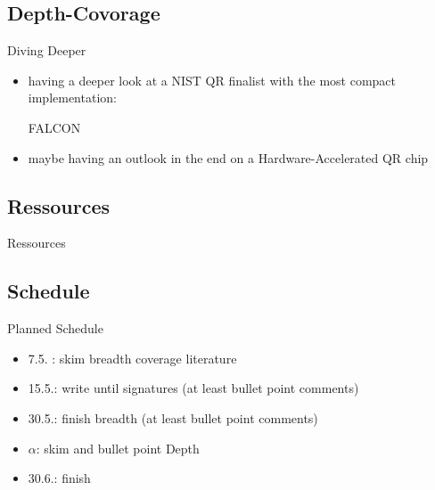 \documentclass[ucs,10pt]{beamer}
\begin{document}
\subsection{Depth-Covorage}
\begin{frame}{Diving Deeper}
  \begin{itemize}
    \item  having a deeper look at a NIST QR finalist with the most compact implementation:

    FALCON \cite{falcon_and_dilithium,falcon_micro_impl,bearz}
   
    \item  maybe having an outlook in the end on a Hardware-Accelerated QR chip \cite{IoT_ASIC} 
  \end{itemize}

\end{frame}

\subsection{Ressources}
\begin{frame}[allowframebreaks]{Ressources}
  
  
\end{frame}

\subsection{Schedule}
\begin{frame}{Planned Schedule}
\begin{itemize}
  \item 7.5. : skim breadth coverage literature
  \item 15.5.: write until signatures (at least bullet point comments)
  \item 30.5.: finish breadth (at least bullet point comments)
  \item $\alpha$: skim and bullet point Depth
  \item 30.6.: finish
\end{itemize}
\end{frame}
\end{document}
